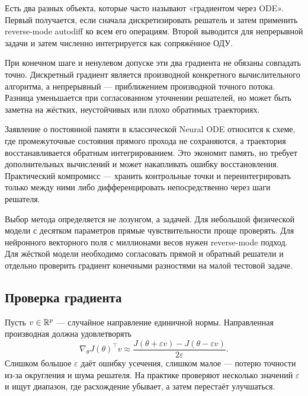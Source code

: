 Есть два разных объекта, которые часто называют «градиентом через ODE». Первый получается, если сначала дискретизировать решатель и затем применить reverse-mode autodiff ко всем его операциям. Второй выводится для непрерывной задачи и затем численно интегрируется как сопряжённое ОДУ.

При конечном шаге и ненулевом допуске эти два градиента не обязаны совпадать точно. Дискретный градиент является производной конкретного вычислительного алгоритма, а непрерывный --- приближением производной точного потока. Разница уменьшается при согласованном уточнении решателей, но может быть заметна на жёстких, неустойчивых или плохо обратимых траекториях.

\begin{caution}
Заявление о постоянной памяти в классической Neural ODE относится к схеме, где промежуточные состояния прямого прохода не сохраняются, а траектория восстанавливается обратным интегрированием. Это экономит память, но требует дополнительных вычислений и может накапливать ошибку восстановления. Практический компромисс --- хранить контрольные точки и переинтегрировать только между ними либо дифференцировать непосредственно через шаги решателя.
\end{caution}

Выбор метода определяется не лозунгом, а задачей. Для небольшой физической модели с десятком параметров прямые чувствительности проще проверять. Для нейронного векторного поля с миллионами весов нужен reverse-mode подход. Для жёсткой модели необходимо согласовать прямой и обратный решатели и отдельно проверить градиент конечными разностями на малой тестовой задаче.

\subsection{Проверка градиента}

Пусть $v\in\mathbb{R}^p$ --- случайное направление единичной нормы. Направленная производная должна удовлетворять
\begin{equation}
\label{eq:directional-gradient-check-v05}
\nabla_\theta J(\theta)^\top v
\approx
\frac{J(\theta+\varepsilon v)-J(\theta-\varepsilon v)}{2\varepsilon}.
\end{equation}
Слишком большое $\varepsilon$ даёт ошибку усечения, слишком малое --- потерю точности из-за округления и шума решателя. На практике проверяют несколько значений $\varepsilon$ и ищут диапазон, где расхождение убывает, а затем перестаёт улучшаться.

